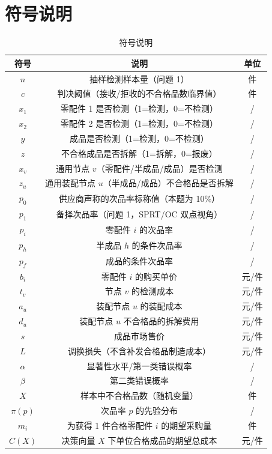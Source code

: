 \documentclass[12pt,a4paper]{ctexart}
\begin{document}
\section{符号说明}

\begin{table}[H]
\centering
\caption{符号说明}
\label{tab:symbols}
\begin{tabular}{ccc}
\toprule
符号 & 说明 & 单位 \\
\midrule
$n$ & 抽样检测样本量（问题 1） & 件 \\
$c$ & 判决阈值（接收/拒收的不合格品数临界值） & 件 \\
$x_1$ & 零配件 1 是否检测（1=检测，0=不检测） & / \\
$x_2$ & 零配件 2 是否检测（1=检测，0=不检测） & / \\
$y$ & 成品是否检测（1=检测，0=不检测） & / \\
$z$ & 不合格成品是否拆解（1=拆解，0=报废） & / \\
$x_v$ & 通用节点 $v$（零配件/半成品/成品）是否检测 & / \\
$z_u$ & 通用装配节点 $u$（半成品/成品）不合格品是否拆解 & / \\
$p_0$ & 供应商声称的次品率标称值（本题为 10\%） & / \\
$p_1$ & 备择次品率（问题 1，SPRT/OC 双点视角） & / \\
$p_i$ & 零配件 $i$ 的次品率 & / \\
$p_h$ & 半成品 $h$ 的条件次品率 & / \\
$p_f$ & 成品的条件次品率 & / \\
$b_i$ & 零配件 $i$ 的购买单价 & 元/件 \\
$t_v$ & 节点 $v$ 的检测成本 & 元/件 \\
$a_u$ & 装配节点 $u$ 的装配成本 & 元/件 \\
$d_u$ & 装配节点 $u$ 不合格品的拆解费用 & 元/件 \\
$s$ & 成品市场售价 & 元/件 \\
$L$ & 调换损失（不含补发合格品制造成本） & 元/件 \\
$\alpha$ & 显著性水平/第一类错误概率 & / \\
$\beta$ & 第二类错误概率 & / \\
$X$ & 样本中不合格品数（随机变量） & 件 \\
$\pi(p)$ & 次品率 $p$ 的先验分布 & / \\
$m_i$ & 为获得 1 件合格零配件 $i$ 的期望采购量 & 件 \\
$C(X)$ & 决策向量 $X$ 下单位合格成品的期望总成本 & 元/件 \\
\bottomrule
\end{tabular}
\end{table}
\end{document}
